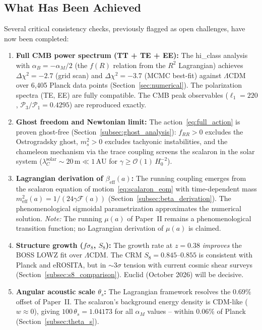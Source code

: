 \documentclass[aps,prd,twocolumn,superscriptaddress,nofootinbib]{revtex4-2}
\begin{document}
\subsection{What Has Been Achieved}

Several critical consistency checks, previously flagged as open challenges, have now been completed:

\begin{enumerate}
\item \textbf{Full CMB power spectrum (TT + TE + EE):} The hi\_class analysis with $\alpha_B = -\alpha_M/2$ (the $f(R)$ relation from the $R^2$ Lagrangian) achieves $\Delta\chi^2 = -2.7$ (grid scan) and $\Delta\chi^2 = -3.7$ (MCMC best-fit) against $\Lambda$CDM over 6{,}405 Planck data points (Section~\ref{sec:numerical}). The polarization spectra (TE, EE) are fully compatible. The CMB peak observables ($\ell_1 = 220$, $\mathcal{P}_3/\mathcal{P}_1 = 0.4295$) are reproduced exactly.

\item \textbf{Ghost freedom and Newtonian limit:} The action~\eqref{eq:full_action} is proven ghost-free (Section~\ref{subsec:ghost_analysis}): $f_{RR} > 0$ excludes the Ostrogradsky ghost, $m_s^2 > 0$ excludes tachyonic instabilities, and the chameleon mechanism via the trace coupling screens the scalaron in the solar system ($\lambda_C^{\mathrm{solar}} \sim 20\,\mathrm{m} \ll 1\,\mathrm{AU}$ for $\gamma \geq \mathcal{O}(1)\,H_0^{-2}$).

\item \textbf{Lagrangian derivation of $\beta_{\mathrm{eff}}(a)$:} The running coupling emerges from the scalaron equation of motion~\eqref{eq:scalaron_eom} with time-dependent mass $m_{\mathrm{eff}}^2(a) = 1/(24\gamma\mathcal{F}(a))$ (Section~\ref{subsec:beta_derivation}). The phenomenological sigmoidal parametrization approximates the numerical solution. \textit{Note:} The running $\mu(a)$ of Paper~II remains a phenomenological transition function; no Lagrangian derivation of $\mu(a)$ is claimed.

\item \textbf{Structure growth ($f\sigma_8$, $S_8$):} The growth rate at $z = 0.38$ \textit{improves} the BOSS LOWZ fit over $\Lambda$CDM. The CRM $S_8 = 0.845$--$0.855$ is consistent with Planck and eROSITA, but in $\sim 3\sigma$ tension with current cosmic shear surveys (Section~\ref{subsec:s8_comparison}). Euclid (October 2026) will be decisive.

\item \textbf{Angular acoustic scale $\theta_s$:} The Lagrangian framework resolves the $0.69\%$ offset of Paper~II. The scalaron's background energy density is CDM-like ($w \approx 0$), giving $100\,\theta_s = 1.04173$ for all $\alpha_M$ values -- within $0.06\%$ of Planck (Section~\ref{subsec:theta_s}).


\end{enumerate}
\end{document}
